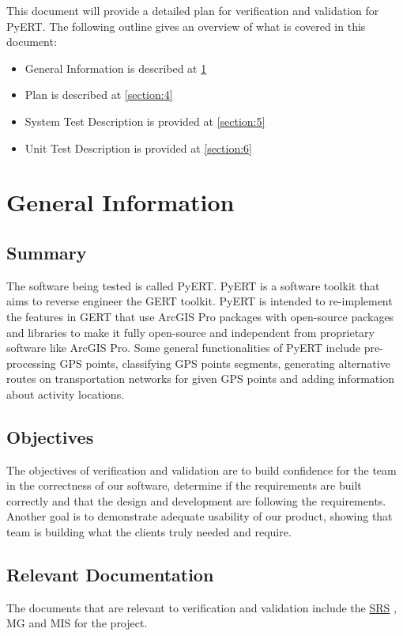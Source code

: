 \documentclass[12pt, titlepage]{article}
\begin{document}
\newpage


This document will provide a detailed plan for verification and validation for PyERT. The following outline gives an overview of what is covered in this document:
\begin{itemize}
    \item General Information is described at \ref{section:3}
    \item Plan is described at \ref{section:4}
    \item System Test Description is provided at \ref{section:5}
    \item Unit Test Description is provided at \ref{section:6}
\end{itemize}

\section{General Information}
\label{section:3}
\subsection{Summary}
The software being tested is called PyERT. PyERT is a software toolkit that aims to reverse engineer the GERT toolkit. PyERT is intended to re-implement the features in GERT that use ArcGIS Pro packages with open-source packages and libraries to make it fully open-source and independent from proprietary software like ArcGIS Pro. Some general functionalities of PyERT include pre-processing GPS points, classifying GPS points segments, generating alternative routes on transportation networks for given GPS points and adding information about activity locations.\\

\subsection{Objectives}
The objectives of verification and validation are to build confidence for the team in the correctness of our software, determine if the requirements are built correctly and that the design and development are following the requirements. Another goal is to demonstrate adequate usability of our product, showing that team is building what the clients truly needed and require.\\

\subsection{Relevant Documentation}
The documents that are relevant to verification and validation include the \href{https://github.com/paezha/PyERT-BLACK/blob/main/docs/SRS/SRS.pdf}{SRS} \citep{SRS}, MG and MIS for the project.
\end{document}
